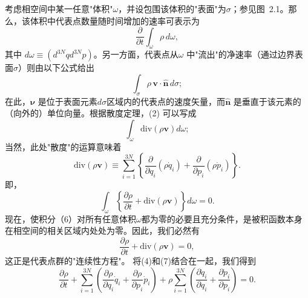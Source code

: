 考虑相空间中某一任意"体积"\(\omega\)，并设包围该体积的"表面"为\(\sigma\)；参见图~2.1。那么，该体积中代表点数量随时间增加的速率可表示为
\begin{equation}\tag{2.2.1}\label{eq:2.2.1}
\frac { \partial } { \partial t } \int _ { \omega } \rho \, d \omega ,
\end{equation}
其中 \(d\omega \equiv (d^{3N}q d^{3N}p)\)。另一方面，代表点从\(\omega\) 中"流出"的净速率（通过边界表面\(\sigma\)）则由以下公式给出
\begin{equation}\tag{2.2.2}\label{eq:2.2.2}
\int _ { \sigma } \rho \, \boldsymbol { v } \cdot \hat { \mathbf { n } } \, d \sigma ;
\end{equation}
在此，\(\boldsymbol{\nu}\) 是位于表面元素\(d\sigma\)区域内的代表点的速度矢量，而\(\hat{\boldsymbol{n}}\) 是垂直于该元素的（向外的）单位向量。根据散度定理，(2) 可以写成
\begin{equation}\tag{2.2.3}\label{eq:2.2.3}
\int _ { \omega } \mathrm { d i v } ( \rho \mathbf { v } ) d \omega ;
\end{equation}
当然，此处"散度"的运算意味着
\begin{equation}\tag{2.2.4}\label{eq:2.2.4}
\mathrm { d i v } ( \rho \mathbf { v } ) \equiv \sum _ { i = 1 } ^{3 N} \left\{ \frac { \partial } { \partial q _ { i } } ( \rho \dot { q } _ { i } ) + \frac { \partial } { \partial p _ { i } } ( \rho \dot { p } _ { i } ) \right\} .
\end{equation}
即，
\begin{equation}\tag{2.2.5}\label{eq:2.2.5}
\int _ { \omega } \left\{ \frac { \partial \rho } { \partial t } + \mathrm { d i v } ( \rho \mathbf { v } ) \right\} d \omega = 0 .
\end{equation}
现在，使积分（6）对所有任意体积\(\omega\)都为零的必要且充分条件，是被积函数本身在相空间的相关区域内处处为零。因此，我们必然有
\begin{equation}\tag{2.2.6}\label{eq:2.2.6}
\frac { \partial \rho } { \partial t } + \mathrm { d i v } ( \rho \pmb { v } ) = 0 ,
\end{equation}
这正是代表点群的"连续性方程"。
将(4)和(7)结合在一起，我们得到
\begin{equation}\tag{2.2.7}\label{eq:2.2.7}
\frac { \partial \rho } { \partial t } + \sum _ { i = 1 } ^{3 N} \left( \frac { \partial \rho } { \partial q _ { i } } \dot { q } _ { i } + \frac { \partial \rho } { \partial p _ { i } } \dot { p } _ { i } \right) + \rho \sum _ { i = 1 } ^{3 N} \left( \frac { \partial \dot { q } _ { i } } { \partial q _ { i } } + \frac { \partial \dot { p } _ { i } } { \partial p _ { i } } \right) = 0 .
\end{equation}
